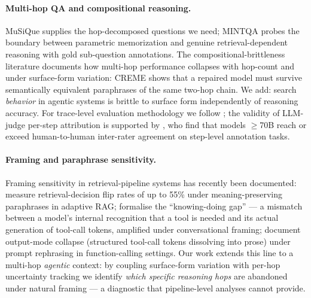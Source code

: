 \documentclass[10pt,letterpaper]{article}
\begin{document}
\paragraph{Multi-hop QA and compositional reasoning.}
MuSiQue \citep{musique} supplies the hop-decomposed questions we need; MINTQA
\citep{mintqa2024} probes the boundary between parametric memorization and genuine
retrieval-dependent reasoning with gold sub-question annotations. The compositional-brittleness
literature \citep{li2024patching,yang2024latent,wu2024mrke} documents how multi-hop
performance collapses with hop-count and under surface-form variation: CREME
\citep{li2024patching} shows that a repaired model must survive semantically equivalent
paraphrases of the same two-hop chain. We add: search \emph{behavior} in agentic
systems is brittle to surface form independently of reasoning accuracy.
For trace-level evaluation methodology we follow \citet{lee2025reasoningtraces};
the validity of LLM-judge per-step attribution is supported by \citet{han2025judgeverdict},
who find that models $\geq$70B reach or exceed human-to-human inter-rater agreement on
step-level annotation tasks.

\paragraph{Framing and paraphrase sensitivity.}
Framing sensitivity in retrieval-pipeline systems has recently been documented:
\citet{howask2026} measure retrieval-decision flip rates of up to 55\% under
meaning-preserving paraphrases in adaptive RAG;
\citet{knowingdoing2026} formalise the ``knowing-doing gap'' --- a mismatch between
a model's internal recognition that a tool is needed and its actual generation of
tool-call tokens, amplified under conversational framing;
\citet{rabinovich2025agentic} document output-mode collapse (structured tool-call
tokens dissolving into prose) under prompt rephrasing in function-calling settings.
Our work extends this line to a multi-hop \emph{agentic} context: by coupling
surface-form variation with per-hop uncertainty tracking we identify
\emph{which specific reasoning hops} are abandoned under natural framing --- a
diagnostic that pipeline-level analyses cannot provide.
\end{document}
